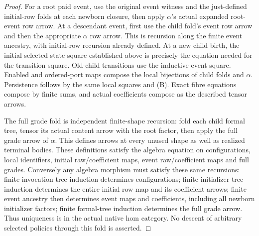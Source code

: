 \documentclass[11pt]{article}
\begin{document}
\begin{proof}
For a root paid event, use the original event witness and the just-defined initial-row folds at each newborn closure, then apply $\alpha$'s actual expanded root-event row arrow. At a descendant event, first use the child fold's event row arrow and then the appropriate $\alpha$ row arrow. This is recursion along the finite event ancestry, with initial-row recursion already defined. At a new child birth, the initial selected-state square established above is precisely the equation needed for the transition square. Old-child transitions use the inductive event square. Enabled and ordered-port maps compose the local bijections of child folds and $\alpha$. Persistence follows by the same local squares and (B). Exact fibre equations compose by finite sums, and actual coefficients compose as the described tensor arrows.

The full grade fold is independent finite-shape recursion: fold each child formal tree, tensor its actual content arrow with the root factor, then apply the full grade arrow of $\alpha$. This defines arrows at every unused shape as well as realized terminal bodies. These definitions satisfy the algebra equation on configurations, local identifiers, initial raw/coefficient maps, event raw/coefficient maps and full grades. Conversely any algebra morphism must satisfy these same recursions: finite invocation-tree induction determines configurations; finite initializer-tree induction determines the entire initial row map and its coefficient arrows; finite event ancestry then determines event maps and coefficients, including all newborn initializer factors; finite formal-tree induction determines the full grade arrow. Thus uniqueness is in the actual native hom category. No descent of arbitrary selected policies through this fold is asserted.
\end{proof}
\end{document}
